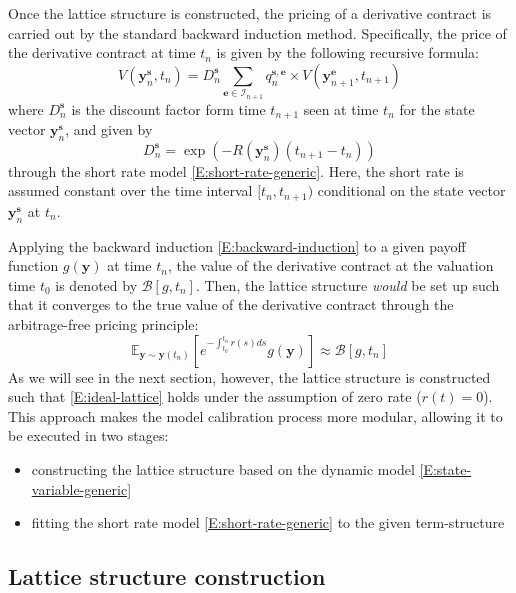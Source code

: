 \documentclass{texyise}
\newcommand{\indexset}{\mathcal{I}}
\newcommand{\valuebackward}{\mathcal{B}}
\begin{document}
Once the lattice structure is constructed, the pricing of a derivative contract is carried out by the standard backward induction method. Specifically, the price of the derivative contract at time $t_n$ is given by the following recursive formula:
\begin{equation}
    V(\bm{y}_{n}^{\bm{s}}, t_n) = D_n^{\bm{s}}\sum_{\bm{e} \in \indexset_{n+1}} q_{n}^{\bm{s},\bm{e}} \times V(\bm{y}_{n+1}^{\bm{e}}, t_{n+1}) \label{E:backward-induction}
\end{equation}
where $D_n^{\bm{s}}$ is the discount factor form time $t_{n+1}$ seen at time $t_{n}$ for the state vector $\bm{y}_n^{\bm{s}}$, and given by
\begin{equation}
    D_n^{\bm{s}} = \exp\left(-R(\bm{y}_n^{\bm{s}}) (t_{n+1} -t_n) \right)
    \label{E:discount-factor-node}
\end{equation}
through the short rate model \eqref{E:short-rate-generic}. Here, the short rate is assumed constant over the time interval $[t_n, t_{n+1})$ conditional on the state vector $\bm{y}_n^{\bm{s}}$ at $t_{n}$.

Applying the backward induction \eqref{E:backward-induction} to a given payoff function $g(\bm{y})$ at time $t_n$, the value of the derivative contract at the valuation time $t_0$ is denoted by $\valuebackward[g, t_n]$. Then, the lattice structure {\em would} be set up such that it converges to the true value of the derivative contract through the arbitrage-free pricing principle:
\begin{equation}
    \mathbb{E}_{\bm{y} \sim \bm{y}(t_n)}\left[ e^{-\int_{t_0}^{t_n} r(s)ds} g(\bm{y}) \right] \approx \valuebackward[g,t_n] \label{E:ideal-lattice}
\end{equation}
As we will see in the next section, however, the lattice structure is constructed such that \eqref{E:ideal-lattice} holds under the assumption of zero rate ($r(t) = 0$). This approach makes the model calibration process more modular, allowing it to be executed in two stages:
\begin{itemize}
    \item constructing the lattice structure based on the dynamic model \eqref{E:state-variable-generic}
    \item fitting the short rate model \eqref{E:short-rate-generic} to the given term-structure
\end{itemize}

\subsection{Lattice structure construction}
\label{S:lattice-structure-construction}
\end{document}
